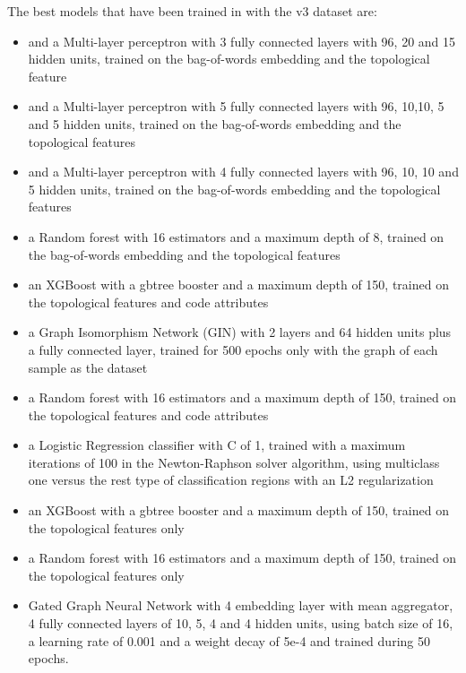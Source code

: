 \begin{appendices}
\begin{itemize}
\end{itemize}





The best models that have been trained in with the v3 dataset are:
\begin{itemize}
    \item and a Multi-layer perceptron with 3 fully connected layers with 96, 20 and 15 hidden units, trained on the bag-of-words embedding and the topological feature
    \item and a Multi-layer perceptron with 5 fully connected layers with 96, 10,10, 5 and 5 hidden units, trained on the bag-of-words embedding and the topological features
    \item and a Multi-layer perceptron with 4 fully connected layers with 96, 10, 10 and 5 hidden units, trained on the bag-of-words embedding and the topological features
    \item a Random forest with 16 estimators and a maximum depth of 8, trained on the bag-of-words embedding and the topological features
    \item an XGBoost with a gbtree booster and a maximum depth of 150, trained on the topological features and code attributes
    \item a Graph Isomorphism Network (GIN) with 2 layers and 64 hidden units plus  a fully connected layer, trained for 500 epochs only with the graph of each sample as the dataset
    \item a Random forest with 16 estimators and a maximum depth of 150, trained on the topological features and code attributes
    \item a Logistic Regression classifier with C of 1, trained with a maximum iterations of 100 in the Newton-Raphson solver algorithm, using multiclass one versus the rest type of classification regions with an L2 regularization
    \item an XGBoost with a gbtree booster and a maximum depth of 150, trained on the topological features only
    \item a Random forest with 16 estimators and a maximum depth of 150, trained on the topological features only
    \item Gated Graph Neural Network with 4 embedding layer with mean aggregator, 4 fully connected layers of 10, 5, 4 and 4 hidden units, using batch size of 16, a learning rate of 0.001 and a weight decay of 5e-4 and trained during 50 epochs.
\end{itemize}




\end{appendices}
